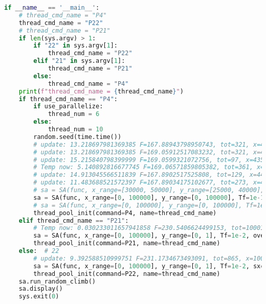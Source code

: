 \begin{lstlisting}[language=Python,breaklines=true]
if __name__ == '__main__':
    # thread_cmd_name = "P4"
    thread_cmd_name = "P22"
    # thread_cmd_name = "P21"
    if len(sys.argv) > 1:
        if "22" in sys.argv[1]:
            thread_cmd_name = "P22"
        elif "21" in sys.argv[1]:
            thread_cmd_name = "P21"
        else:
            thread_cmd_name = "P4"
    print(f"thread_cmd_name = {thread_cmd_name}")
    if thread_cmd_name == "P4":
        if use_parallelize:
            thread_num = 6
        else:
            thread_num = 10
        random.seed(time.time())
        # update: 13.218697981369385 F=167.88943798950743, tot=321, x=44327.87533235402, y=30148.311347844916, count=19
        # update: 13.218697981369385 F=169.05912517083232, tot=321, x=43632.96648718373, y=32537.93339891905, count=19
        # update: 15.215840798399999 F=169.0599321072756, tot=97, x=43545.90864931983, y=32672.206619840814, count=5
        # Temp now: 5.140892816677745 F=169.06571859805382, tot=361, x=43408.15188934769, y=30062.39077757641, count=44
        # update: 14.913045566511839 F=167.8902517525808, tot=129, x=44492.630422162256, y=29644.097073419372, count=7
        # update: 11.483688521572397 F=167.89034175102677, tot=273, x=44493.76334705677, y=29418.730190797396, count=33
        # sa = SA(func, x_range=[30000, 50000], y_range=[25000, 40000], Tf=1e-1, sx=44493.76334705677, sy=29418.730190797396, overflow=300)
        sa = SA(func, x_range=[0, 100000], y_range=[0, 100000], Tf=1e-1, sx=44493.76334705677, sy=29418.730190797396, overflow=300)
        # sa = SA(func, x_range=[0, 100000], y_range=[0, 100000], Tf=1e-1, overflow=300)
        thread_pool_init(command=P4, name=thread_cmd_name)
    elif thread_cmd_name == "P21":
        # Temp now: 0.030233011657941858 F=230.5406624499153, tot=10001, x=37267.434515546855, count=624
        sa = SA(func, x_range=[0, 100000], y_range=[0, 1], Tf=1e-2, overflow=300, sx=37267.434515546855)
        thread_pool_init(command=P21, name=thread_cmd_name)
    else:  # 22
        # update: 9.392588510999751 F=231.1734673493091, tot=865, x=100000, y=0.4156291981028539, count=53
        sa = SA(func, x_range=[0, 100000], y_range=[0, 1], Tf=1e-2, sx=100000, sy=0.4156291981028539, overflow=300)
        thread_pool_init(command=P22, name=thread_cmd_name)
    sa.run_random_climb()
    sa.display()
    sys.exit(0) 
\end{lstlisting}